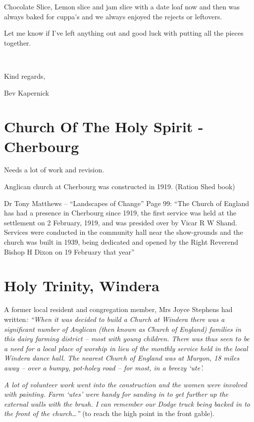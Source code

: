 Chocolate Slice, Lemon slice and jam slice with a date loaf now and then was always baked for cuppa's and we always enjoyed the rejects or leftovers.

Let me know if I've left anything out and good luck with putting all the pieces together.

~

Kind regards,

Bev Kapernick

\hypertarget{church-of-the-holy-spirit---cherbourg-1}{%
\section{Church Of The Holy Spirit - Cherbourg}\label{church-of-the-holy-spirit---cherbourg-1}}

Needs a lot of work and revision.

Anglican church at Cherbourg was constructed in 1919. (Ration Shed book)

Dr Tony Matthews -- ``Landscapes of Change'' Page 99: ``The Church of England has had a presence in Cherbourg since 1919, the first service was held at the settlement on 2 February, 1919, and was presided over by Vicar R W Shand. Services were conducted in the community hall near the show-grounds and the church was built in 1939, being dedicated and opened by the Right Reverend Bishop H Dixon on 19 February that year''

\hypertarget{holy-trinity-windera-1}{%
\section{Holy Trinity, Windera}\label{holy-trinity-windera-1}}

A former local resident and congregation member, Mrs Joyce Stephens had written\emph{: ``When it was decided to build a Church at Windera there was a significant number of Anglican (then known as Church of England) families in this dairy farming district -- most with young children. There was thus seen to be a need for a local place of worship in lieu of the monthly service held in the local Windera dance hall. The nearest Church of England was at Murgon, 18 miles away -- over a bumpy, pot-holey road -- for most, in a breezy `ute'.}

\emph{A lot of volunteer work went into the construction and the women were involved with painting. Farm `utes' were handy for sanding in to get further up the external walls with the brush. I can remember our Dodge truck being backed in to the front of the church\ldots''} (to reach the high point in the front gable).

